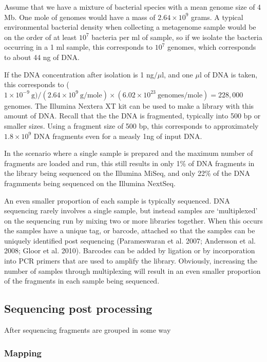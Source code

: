 \documentclass[onecolumn]{article}
\begin{document}
Assume that we have a mixture of bacterial species with a mean genome size of 4 Mb. One mole of genomes would have a mass of \(2.64 \times 10^9\) grams. A typical environmental bacterial density when collecting a metagenome sample would be on the order of at least \(10^7\) bacteria per ml of sample, so if we isolate the bacteria occurring in a 1 ml sample, this corresponds to \(10^7\) genomes, which corresponds to about 44 ng of DNA.

If the DNA concentration after isolation is 1 ng\(/ \mu\)l, and one \(\mu\)l of DNA is taken, this corresponds to (\(1\times 10^{-9} \mathrm{\ g}) / (2.64 \times 10^9\ \mathrm{g/mole}) \times (6.02 \times 10^{23} \mathrm{\ genomes/mole}) = 228,000\) genomes. The Illumina Nextera XT kit can be used to make a library with this amount of DNA. Recall that the the DNA is fragmented, typically into 500 bp or smaller sizes. Using a fragment size of 500 bp, this corresponds to approximately \(1.8 \times 10^9\) DNA fragments even for a measly 1ng of input DNA.

In the scenario where a single sample is prepared and the maximum number of fragments are loaded and run, this still results in only 1\% of DNA fragments in the library being sequenced on the Illumina MiSeq, and only 22\% of the DNA fragmments being sequenced on the Illumina NextSeq.

An even smaller proportion of each sample is typically sequenced. DNA sequencing rarely involves a single sample, but instead samples are `multiplexed' on the sequencing run by mixing two or more libraries together. When this occurs the samples have a unique tag, or barcode, attached so that the samples can be uniquely identified post sequencing (Parameswaran et al. 2007; Andersson et al. 2008; Gloor et al. 2010). Barcodes can be added by ligation or by incorporation into PCR primers that are used to amplify the library. Obviously, increasing the number of samples through multiplexing will result in an even smaller proportion of the fragments in each sample being sequenced.

\hypertarget{sequencing-post-processing}{%
\subsection{Sequencing post processing}\label{sequencing-post-processing}}

After sequencing fragments are grouped in some way

\hypertarget{mapping}{%
\subsubsection{Mapping}\label{mapping}}
\end{document}

